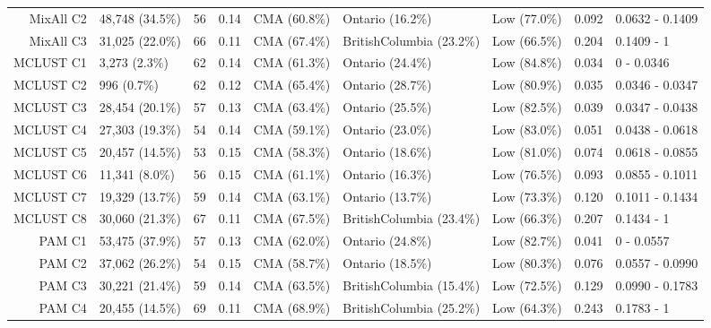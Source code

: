 \documentclass[11pt, a4paper]{article}
\begin{document}
\begin{table}[H]
{\begin{tabular}{|r|llllllll|}
  MixAll C2 & 48,748 (34.5\%) & 56 & 0.14 & CMA (60.8\%) & Ontario (16.2\%) & Low (77.0\%) & 0.092 & 0.0632 - 0.1409 \\
  MixAll C3 & 31,025 (22.0\%) & 66 & 0.11 & CMA (67.4\%) & BritishColumbia (23.2\%) & Low (66.5\%) & 0.204 & 0.1409 - 1 \\
\rowcolor{gray!25}  MCLUST C1 & 3,273 (2.3\%) & 62 & 0.14 & CMA (61.3\%) & Ontario (24.4\%) & Low (84.8\%) & 0.034 & 0 - 0.0346 \\
 \rowcolor{gray!25} MCLUST C2 & 996 (0.7\%) & 62 & 0.12 & CMA (65.4\%) & Ontario (28.7\%) & Low (80.9\%) & 0.035 & 0.0346 - 0.0347 \\
\rowcolor{gray!25}  MCLUST C3 & 28,454 (20.1\%) & 57 & 0.13 & CMA (63.4\%) & Ontario (25.5\%) & Low (82.5\%) & 0.039 & 0.0347 - 0.0438 \\
 \rowcolor{gray!25} MCLUST C4 & 27,303 (19.3\%) & 54 & 0.14 & CMA (59.1\%) & Ontario (23.0\%) & Low (83.0\%) & 0.051 & 0.0438 - 0.0618 \\
 \rowcolor{gray!25} MCLUST C5 & 20,457 (14.5\%) & 53 & 0.15 & CMA (58.3\%) & Ontario (18.6\%) & Low (81.0\%) & 0.074 & 0.0618 - 0.0855 \\
 \rowcolor{gray!25} MCLUST C6 & 11,341 (8.0\%) & 56 & 0.15 & CMA (61.1\%) & Ontario (16.3\%) & Low (76.5\%) & 0.093 & 0.0855 - 0.1011 \\
\rowcolor{gray!25}  MCLUST C7 & 19,329 (13.7\%) & 59 & 0.14 & CMA (63.1\%) & Ontario (13.7\%) & Low (73.3\%) & 0.120 & 0.1011 - 0.1434 \\
\rowcolor{gray!25}  MCLUST C8 & 30,060 (21.3\%) & 67 & 0.11 & CMA (67.5\%) & BritishColumbia (23.4\%) & Low (66.3\%) & 0.207 & 0.1434 - 1 \\
  PAM C1 & 53,475 (37.9\%) & 57 & 0.13 & CMA (62.0\%) & Ontario (24.8\%) & Low (82.7\%) & 0.041 & 0 - 0.0557 \\
  PAM C2 & 37,062 (26.2\%) & 54 & 0.15 & CMA (58.7\%) & Ontario (18.5\%) & Low (80.3\%) & 0.076 & 0.0557 - 0.0990 \\
  PAM C3 & 30,221 (21.4\%) & 59 & 0.14 & CMA (63.5\%) & BritishColumbia (15.4\%) & Low (72.5\%) & 0.129 & 0.0990 - 0.1783 \\
  PAM C4 & 20,455 (14.5\%) & 69 & 0.11 & CMA (68.9\%) & BritishColumbia (25.2\%) & Low (64.3\%) & 0.243 & 0.1783 - 1 \\
   \hline
\end{tabular}
}
\end{table}
\end{document}

